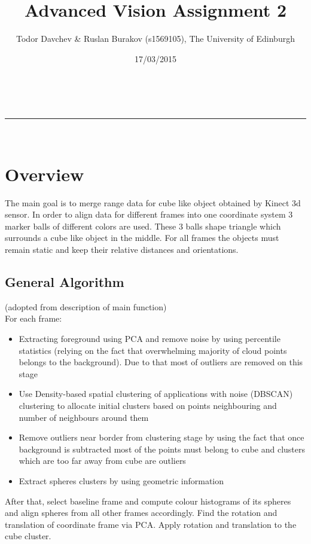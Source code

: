\documentclass[a4paper,11pt]{article}
\makeatletter
\newcommand{\linia}{\rule{\linewidth}{0.5pt}}
\theoremstyle{mytheor}
\renewcommand{\maketitle}{
\begin{center}
\vspace{2ex}
{\huge \textsc{\@title}}
\vspace{1ex}
\\
\linia\\
\@author \hfill \@date
\vspace{4ex}
\end{center}
}
\makeatother
\begin{document}
\title{Advanced Vision Assignment \textnumero{} 2}

\author{Todor Davchev \& Ruslan Burakov (s1569105), The University of Edinburgh}

\date{17/03/2015}

\maketitle

\section{Overview}
The main goal is to merge range data for cube like object obtained by Kinect 3d sensor. In order to align data for different frames into one coordinate system 3 marker balls of different colors are used. These 3 balls shape triangle which surrounds a cube like object in the middle. For all frames the objects must remain static and keep their relative distances and orientations.\\
\subsection{General Algorithm}
(adopted from description of main function)\\
For each frame:
\begin{itemize}
  \item Extracting foreground using PCA and remove noise by using percentile statistics (relying on the fact that overwhelming majority of cloud points belongs to the background). Due to that most of outliers are removed on this stage
  \item Use Density-based spatial clustering of applications with noise (DBSCAN) clustering to allocate initial clusters based on points neighbouring and number of neighbours around them
  \item Remove outliers near border from clustering stage by using the fact that once background is subtracted most of the points must belong to cube and clusters which are too far away from cube are outliers
  \item Extract spheres clusters by using geometric information
\end{itemize}

After that, select baseline frame and compute colour histograms of its spheres and align spheres from all other frames accordingly. Find the rotation and translation of coordinate frame via PCA. Apply rotation and translation to the cube cluster.
\end{document}
